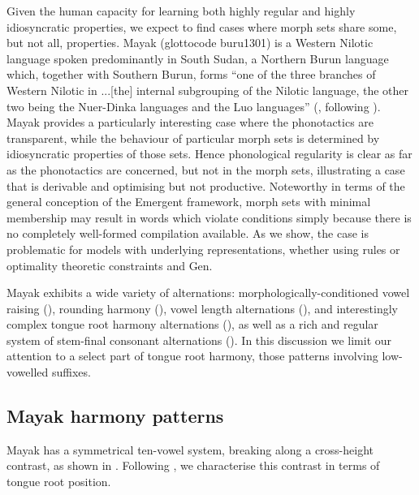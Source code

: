 Given the human capacity for learning both highly regular and highly idiosyncratic properties, we expect to find cases where morph sets share some, but not all, properties. Mayak (glottocode buru1301) is a Western Nilotic language spoken predominantly in South Sudan, a Northern Burun language which, together with Southern Burun, forms ``one of the three branches of Western Nilotic in ...[the] internal subgrouping of the Nilotic language, the other two being the Nuer-Dinka languages and the Luo languages'' (\citealt[1]{Andersen:1999-Vs}, following \citealt{Kohler:1955}). Mayak provides a particularly interesting case where the phonotactics are transparent, while the behaviour of particular morph sets is determined by idiosyncratic properties of those sets. Hence phonological regularity is clear as far as the phonotactics are concerned, but not in the morph sets, illustrating a case that is derivable and optimising but not productive. Noteworthy in terms of the general conception of the Emergent framework, morph sets with minimal membership may result in words which violate conditions simply because there is no completely well-formed compilation available. As we show, the case is problematic for models with underlying representations, whether using rules or optimality theoretic constraints and Gen.
 


Mayak exhibits a wide variety of alternations: morphologically-conditioned vowel raising (\citealt{Andersen:1999-Vs, Trommer:2016}), rounding harmony (\citealt{Andersen:1999-Vs, McCollum:2017}), vowel length alternations (\citealt{Andersen:1999-Vs}), and interestingly complex tongue root harmony alternations (\citealt{Andersen:1999-Vs, Andersen:2000, Finley:2007, Ozburn:2019}), as well as a rich and regular system of stem-final consonant alternations (\citealt{Andersen:1999-Cs}). In this discussion we limit our attention to a select part of tongue root harmony, %
those patterns involving low-vowelled suffixes.
 

\subsection{Mayak harmony patterns}

Mayak has a symmetrical ten-vowel system, breaking along a cross-height contrast, as shown in . Following \citet{Andersen:1999-Vs}, we characterise this contrast in terms of tongue root position.

